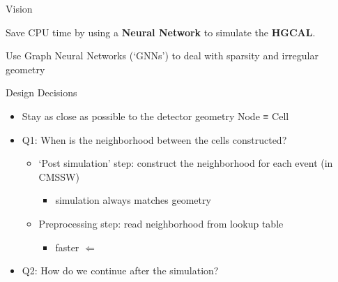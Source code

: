 \documentclass[lualatex,handout,aspectratio=1610]{beamer}
\begin{document}
\maketitle


\begin{frame}{Vision}
	\begin{center}
		\large Save CPU time by using a \textbf{Neural Network} to simulate the \textbf{HGCAL}.
	\end{center}
	\vfill
	\pause
	\begin{center}
		\small Use Graph Neural Networks (`GNNs') to deal with sparsity and irregular geometry
	\end{center}

\end{frame}



\begin{frame}{Design Decisions}
	\begin{itemize}[<+->]
		\item Stay as close as possible to the detector geometry \imp Node ≡ Cell
		\item Q1: When is the neighborhood between the cells constructed?\\
		      \begin{itemize}
			      \item `Post simulation' step: construct the neighborhood for each event (in CMSSW)
			            \begin{itemize}
				            \item simulation always matches geometry
			            \end{itemize}
			            \pause\vs
			      \item Preprocessing step: read neighborhood from lookup table
			            \begin{itemize}
				            \item faster $⇐$
			            \end{itemize}
		      \end{itemize}
		\item Q2: How do we continue after the simulation?%
	\end{itemize}
\end{frame}
\end{document}
